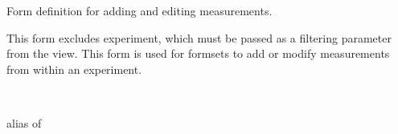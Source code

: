 \documentclass[letterpaper,10pt,english]{sphinxmanual}
\begin{document}

\begin{fulllineitems}
\label{api:data.forms.MeasurementForm}
Form definition for adding and editing measurements.

This form excludes experiment, which must be passed as a filtering parameter from the view.  
This form is used for formsets to add or modify measurements from within an experiment.

\begin{fulllineitems}
\label{api:data.forms.MeasurementForm.Meta}~

\begin{fulllineitems}
\label{api:data.forms.MeasurementForm.Meta.model}
alias of 

\end{fulllineitems}


\end{fulllineitems}


\begin{fulllineitems}
\label{api:data.forms.MeasurementForm.media}
\end{fulllineitems}


\end{fulllineitems}

\end{document}
